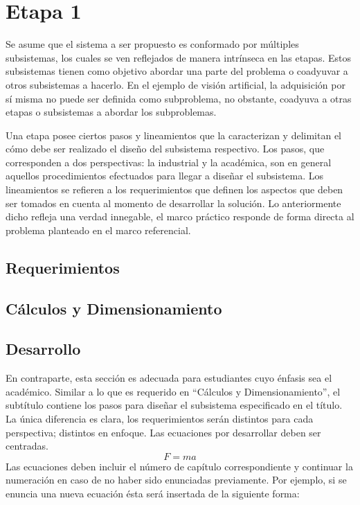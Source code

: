 \section{Etapa 1}
Se asume que el sistema a ser propuesto es conformado por múltiples subsistemas, los cuales se ven reflejados de manera intrínseca en las etapas. Estos subsistemas tienen como objetivo abordar una parte del problema o coadyuvar a otros subsistemas a hacerlo. En el ejemplo de visión artificial, la adquisición por sí misma no puede ser definida como subproblema, no obstante, coadyuva a otras etapas o subsistemas a abordar los subproblemas.  

Una etapa posee ciertos pasos y lineamientos que la caracterizan y delimitan el cómo debe ser realizado el diseño del subsistema respectivo. Los pasos, que corresponden a dos perspectivas: la industrial y la académica, son en general aquellos procedimientos efectuados para llegar a diseñar el subsistema. Los lineamientos se refieren a los requerimientos que definen los aspectos que deben ser tomados en cuenta al momento de desarrollar la solución. Lo anteriormente dicho refleja una verdad innegable, el marco práctico responde de forma directa al problema planteado en el marco referencial.

\subsection{Requerimientos}
\subsection{Cálculos y Dimensionamiento}
\subsection{Desarrollo}
En contraparte, esta sección es adecuada para estudiantes cuyo énfasis sea el académico. Similar a lo que es requerido en “Cálculos y Dimensionamiento”, el subtítulo contiene los pasos para diseñar el subsistema especificado en el título. La única diferencia es clara, los requerimientos serán distintos para cada perspectiva; distintos en enfoque.
Las ecuaciones por desarrollar deben ser centradas.
\begin{equation}
	F = ma
\end{equation}
Las ecuaciones deben incluir el número de capítulo correspondiente y continuar la numeración en caso de no haber sido enunciadas previamente. Por ejemplo, si se enuncia una nueva ecuación ésta será insertada de la siguiente forma:

